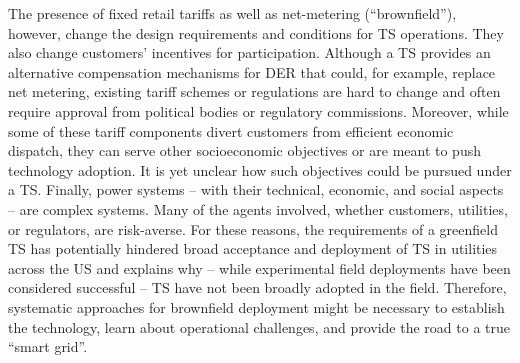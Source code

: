 The presence of fixed retail tariffs as well as net-metering (``brownfield''), however, change the design requirements and conditions for TS operations. They also change customers' incentives for participation. 
Although a TS provides an alternative compensation mechanisms for DER that could, for example, replace net metering, existing tariff schemes or regulations are hard to change and often require approval from political bodies or regulatory commissions. 
Moreover, while some of these tariff components divert customers from efficient economic dispatch, they can serve other socioeconomic objectives or are meant to push technology adoption. It is yet unclear how such objectives could be pursued under a TS.
Finally, power systems -- with their technical, economic, and social aspects -- are complex systems. Many of the agents involved, whether customers, utilities, or regulators, are risk-averse. 
For these reasons, the requirements of a greenfield TS has potentially hindered broad acceptance and deployment of TS in utilities across the US and explains why -- while experimental field deployments have been considered successful -- TS have not been broadly adopted in the field.
Therefore, systematic approaches for brownfield deployment might be necessary to establish the technology, learn about operational challenges, and provide the road to a true ``smart grid''.

